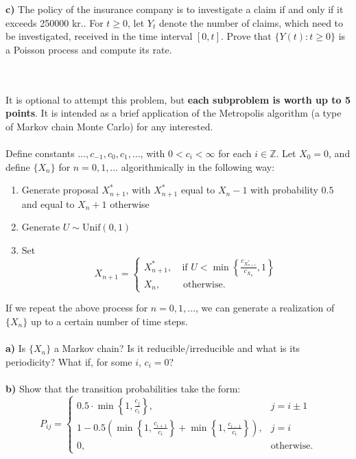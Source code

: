 \documentclass[1p]{article}		%
\begin{document}
\noindent
\textbf{c)} The policy of the insurance company is to investigate a claim if and only
if it exceeds 250000 kr.. For $t\geq 0$, let $Y_t$ denote the number of claims, which need
to be investigated, received in the time
interval $[0,t]$. Prove that 
$\{Y(t): t\geq 0\}$ is a Poisson process and compute its rate.

\newpage
{}\\\\
It is optional to attempt this problem, but \textbf{each subproblem is worth up to 5 points}. It is intended as a brief application of the Metropolis algorithm (a type of Markov chain Monte Carlo) for any interested.\\\\
\noindent
Define constants $\ldots, c_{-1}, c_0, c_1, \ldots$, with $0 < c_i < \infty$ for each $i \in \mathbb{Z}$. Let $X_0=0$, and define $\{X_n\}$ for $n=0, 1, \ldots$ algorithmically in the following way:
\begin{enumerate}
\item[1.] Generate proposal $X_{n+1}^*$, with $X_{n+1}^*$ equal to $X_n - 1$ with probability $0.5$ and equal to $X_n + 1$ otherwise
\item[2.] Generate $U\sim \mbox{Unif}(0, 1)$
\item[3.] Set 
$$ X_{n+1} = \begin{cases}
X_{n+1}^*, & \ \text{if } U < \min \left\{\frac{c_{X_{n+1}^*}}{c_{X_n}}, 1\right\} \\
X_n, & \text{ otherwise.}
\end{cases} $$
\end{enumerate}
If we repeat the above process for $n=0, 1, \ldots$, we can generate a realization of $\{X_n\}$ up to a certain number of time steps.\\\\
\noindent
\textbf{a)} Is $\{X_n\}$ a Markov chain? Is it reducible/irreducible and what is its periodicity? What if, for some $i$, $c_i=0$?\\\\
\noindent
\textbf{b)} Show that the transition probabilities take the form:
$$ P_{ij} = \begin{cases}
0.5 \cdot \min \left\{ 1, \frac{c_j}{c_i} \right\}, & j = i \pm 1 \\
1 - 0.5 \left( \min \left\{ 1, \frac{c_{i+1}}{c_i} \right\} + \min \left\{ 1, \frac{c_{i-1}}{c_i} \right\} \right), & j = i \\
0, & \text{otherwise.}
\end{cases} $$
\end{document}
